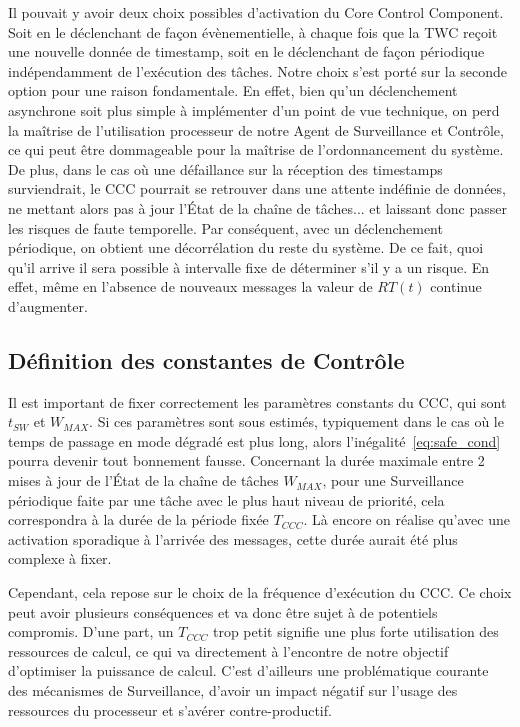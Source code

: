 \documentclass[french, a4paper, 11pt, twoside, pdftex]{StyleThese}
\begin{document}
        Il pouvait y avoir deux choix possibles d'activation du Core Control Component. Soit en le déclenchant de façon évènementielle, à chaque fois que la TWC reçoit une nouvelle donnée de timestamp, soit en le déclenchant de façon périodique indépendamment de l'exécution des tâches. Notre choix s'est porté sur la seconde option pour une raison fondamentale. En effet, bien qu'un déclenchement asynchrone soit plus simple à implémenter d'un point de vue technique, on perd la maîtrise de l'utilisation processeur de notre Agent de Surveillance et Contrôle, ce qui peut être dommageable pour la maîtrise de l'ordonnancement du système. De plus, dans le cas où une défaillance sur la réception des timestamps surviendrait, le CCC pourrait se retrouver dans une attente indéfinie de données, ne mettant alors pas à jour l'État de la chaîne de tâches... et laissant donc passer les risques de faute temporelle. Par conséquent, avec un déclenchement périodique, on obtient une décorrélation du reste du système. De ce fait, quoi qu'il arrive il sera possible à intervalle fixe de déterminer s'il y a un risque. En effet, même en l'absence de nouveaux messages la valeur de $RT(t)$ continue d'augmenter.
        
        
		\subsection{Définition des constantes de Contrôle}
        Il est important de fixer correctement les paramètres constants du CCC, qui sont $t_{SW}$ et $W_{MAX}$.
        Si ces paramètres sont sous estimés, typiquement dans le cas où le temps de passage en mode dégradé est plus long, alors l'inégalité~\ref{eq:safe_cond} pourra devenir tout bonnement fausse. 
        Concernant la durée maximale entre 2 mises à jour de l'État de la chaîne de tâches $W_{MAX}$, pour une Surveillance périodique faite par une tâche avec le plus haut niveau de priorité, cela correspondra à la durée de la période fixée $T_{CCC}$. Là encore on réalise qu'avec une activation sporadique à l'arrivée des messages, cette durée aurait été plus complexe à fixer. 
        
        Cependant, cela repose sur le choix de la fréquence d'exécution du CCC. Ce choix peut avoir plusieurs conséquences et va donc être sujet à de potentiels compromis. D'une part, un $T_{CCC}$ trop petit signifie une plus forte utilisation des ressources de calcul, ce qui va directement à l'encontre de notre objectif d'optimiser la puissance de calcul. C'est d'ailleurs une problématique courante des mécanismes de Surveillance, d'avoir un impact négatif sur l'usage des ressources du processeur et s'avérer contre-productif.
        
\end{document}
